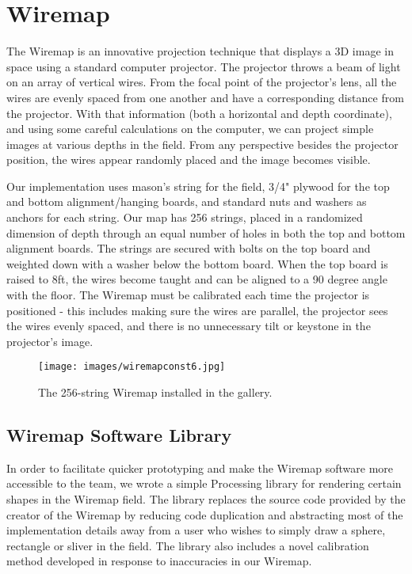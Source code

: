 \section{Wiremap}
The Wiremap is an innovative projection technique that displays a 3D image in space using a standard computer projector. The projector throws a beam of light on an array of vertical wires. From the focal point of the projector’s lens, all the wires are evenly spaced from one another and have a corresponding distance from the projector. With that information (both a horizontal and depth coordinate), and using some careful calculations on the computer, we can project simple images at various depths in the field. From any perspective besides the projector position, the wires appear randomly placed and the image becomes visible.

Our implementation uses mason's string for the field, 3/4" plywood for the top and bottom alignment/hanging boards, and standard nuts and washers as anchors for each string. Our map has 256 strings, placed in a randomized dimension of depth through an equal number of holes in both the top and bottom alignment boards. The strings are secured with bolts on the top board and weighted down with a washer below the bottom board. When the top board is raised to 8ft, the wires become taught and can be aligned to a 90 degree angle with the floor. The Wiremap must be calibrated each time the projector is positioned - this includes making sure the wires are parallel, the projector sees the wires evenly spaced, and there is no unnecessary tilt or keystone in the projector's image.

\begin{figure}[htp]\centering
  \texttt{[image: images/wiremapconst6.jpg]}
  \caption{The 256-string Wiremap installed in the gallery.}\label{fig:wmdiagram}
\end{figure}
\subsection{Wiremap Software Library}
In order to facilitate quicker prototyping and make the Wiremap software more accessible to the team, we wrote a simple Processing library for rendering certain shapes in the Wiremap field. The library replaces the source code provided by the creator of the Wiremap \cite{AH} by reducing code duplication and abstracting most of the implementation details away from a user who wishes to simply draw a sphere, rectangle or sliver in the field. The library also includes a novel calibration method developed in response to inaccuracies in our Wiremap.

